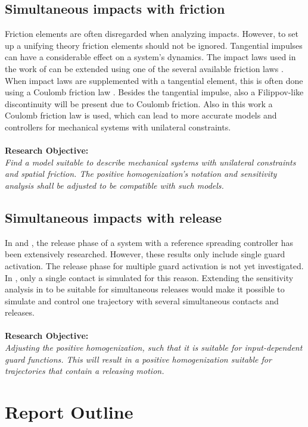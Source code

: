 \documentclass[../DC2017114Bouma.tex]{subfiles}
\begin{document}
\subsection*{Simultaneous impacts with friction}
Friction elements are often disregarded when analyzing impacts. However, to set up a unifying theory friction elements should not be ignored. Tangential impulses can have a considerable effect on a system's dynamics. The impact laws used in the work of \cite{Chen2018a} can be extended using one of the several available friction laws \cite{Leine2008}. When impact laws are supplemented with a tangential element, this is often done using a Coulomb friction law \cite{Glocker2014a}. Besides the tangential impulse, also a Filippov-like discontinuity will be present due to Coulomb friction. Also in this work a Coulomb friction law is used, which can lead to more accurate models and controllers for mechanical systems with unilateral constraints.\\\\
\textbf{Research Objective:}\\
\textit{Find a model suitable to describe mechanical systems with unilateral constraints and spatial friction. The positive homogenization's notation and sensitivity analysis shall be adjusted to be compatible with such models.}

\subsection*{Simultaneous impacts with release}
In \cite{Rijnen2016} and \cite{Rijn2016}, the release phase of a system with a reference spreading controller has been extensively researched. However, these results only include single guard activation. The release phase for multiple guard activation is not yet investigated. In \cite{Chen2018a}, only a single contact is simulated for this reason. Extending the sensitivity analysis in \cite{Chen2018a} to be suitable for simultaneous releases would make it possible to simulate and control one trajectory with several simultaneous contacts and releases.\\\\
\textbf{Research Objective:}\\
\textit{Adjusting the positive homogenization, such that it is suitable for input-dependent guard functions. This will result in a positive homogenization suitable for trajectories that contain a releasing motion.}
\section{Report Outline}
\end{document}
